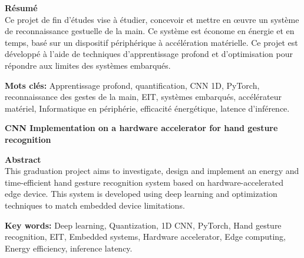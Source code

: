 \documentclass[12pt,a4paper]{article}
\begin{document}
\vspace{0.3cm}

\noindent\textbf{Résumé}\\
Ce projet de fin d’études vise à étudier, concevoir et mettre en œuvre un système de reconnaissance gestuelle de la main. Ce système est économe en énergie et en temps, basé sur un dispositif périphérique à accélération matérielle. Ce projet est développé à l’aide de techniques d’apprentissage profond et d’optimisation pour répondre aux limites des systèmes embarqués.

\vspace{0.3cm}
\noindent\textbf{Mots clés:} Apprentissage profond, quantification, CNN 1D, PyTorch, reconnaissance des gestes de la main, EIT, systèmes embarqués, accélérateur matériel, Informatique en périphérie, efficacité énergétique, latence d’inférence.

\vspace{1cm}

\begin{center}
  \textbf{\Large CNN Implementation on a hardware accelerator for hand gesture recognition}
\end{center}

\vspace{0.3cm}

\noindent\textbf{Abstract}\\
This graduation project aims to investigate, design and implement an energy and time-efficient hand gesture recognition system based on hardware-accelerated edge device. This system is developed using deep learning and optimization techniques to match embedded device limitations.

\vspace{0.3cm}
\noindent\textbf{Key words:} Deep learning, Quantization, 1D CNN, PyTorch, Hand gesture recognition, EIT, Embedded systems, Hardware accelerator, Edge computing, Energy efficiency, inference latency.
\end{document}
